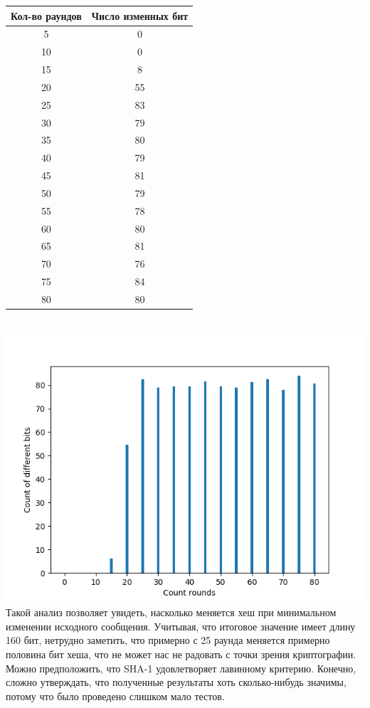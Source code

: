 \documentclass[12pt]{article}
\begin{document}
\begin{tabular}{ | c | c | }
\hline
Кол-во раундов & Число изменных бит \\ \hline
5 & 0 \\ \hline
10 & 0 \\ \hline
15 & 8 \\ \hline
20 & 55 \\ \hline
25 & 83 \\ \hline
30 & 79 \\ \hline
35 & 80 \\ \hline
40 & 79 \\ \hline
45 & 81 \\ \hline
50 & 79 \\ \hline
55 & 78 \\ \hline
60 & 80 \\ \hline
65 & 81 \\ \hline
70 & 76 \\ \hline
75 & 84 \\ \hline
80 & 80 \\ \hline
\end{tabular}
\\
\includegraphics[width=\linewidth]{res.png}\\

Такой анализ позволяет увидеть, насколько меняется хеш при минимальном изменении исходного сообщения. Учитывая, что итоговое значение имеет длину 160 бит, нетрудно заметить, что примерно с 25 раунда меняется примерно половина бит хеша, что не может нас не радовать с точки зрения криптографии. Можно предположить, что SHA-1 удовлетворяет лавинному критерию. Конечно, сложно утверждать, что полученные результаты хоть сколько-нибудь значимы, потому что было проведено слишком мало тестов.
\end{document}
